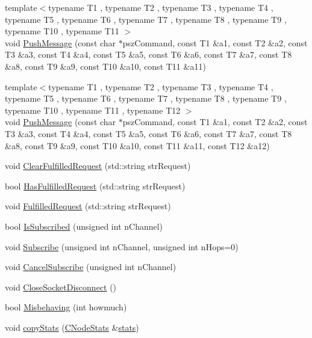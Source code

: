 \begin{DoxyCompactItemize}
\item 
{\footnotesize template$<$typename T1 , typename T2 , typename T3 , typename T4 , typename T5 , typename T6 , typename T7 , typename T8 , typename T9 , typename T10 , typename T11 $>$ }\\void \hyperlink{class_c_node_afeef78359562e34d7e62cbea4bc628fd}{Push\+Message} (const char $\ast$psz\+Command, const T1 \&a1, const T2 \&a2, const T3 \&a3, const T4 \&a4, const T5 \&a5, const T6 \&a6, const T7 \&a7, const T8 \&a8, const T9 \&a9, const T10 \&a10, const T11 \&a11)
\item 
{\footnotesize template$<$typename T1 , typename T2 , typename T3 , typename T4 , typename T5 , typename T6 , typename T7 , typename T8 , typename T9 , typename T10 , typename T11 , typename T12 $>$ }\\void \hyperlink{class_c_node_a9e9e15c8ba33b19041cbf2c2ffdbe9ab}{Push\+Message} (const char $\ast$psz\+Command, const T1 \&a1, const T2 \&a2, const T3 \&a3, const T4 \&a4, const T5 \&a5, const T6 \&a6, const T7 \&a7, const T8 \&a8, const T9 \&a9, const T10 \&a10, const T11 \&a11, const T12 \&a12)
\item 
void \hyperlink{class_c_node_aa57c7ad448501f5c8667d430b390b5ea}{Clear\+Fulfilled\+Request} (std\+::string str\+Request)
\item 
bool \hyperlink{class_c_node_ae94af0e82ca84242e420fc53debe6f25}{Has\+Fulfilled\+Request} (std\+::string str\+Request)
\item 
void \hyperlink{class_c_node_a5b378bdd447e2f1e63ced2ae5b36ed76}{Fulfilled\+Request} (std\+::string str\+Request)
\item 
bool \hyperlink{class_c_node_a2309cc5f763bce683337201ea5a640a2}{Is\+Subscribed} (unsigned int n\+Channel)
\item 
void \hyperlink{class_c_node_a47f2a21abf98bd2d2dba2894124d3114}{Subscribe} (unsigned int n\+Channel, unsigned int n\+Hops=0)
\item 
void \hyperlink{class_c_node_ac1be1dbc7917e7f5956dd063bd6f271d}{Cancel\+Subscribe} (unsigned int n\+Channel)
\item 
void \hyperlink{class_c_node_a63a6091a0b0fc0987d9436e1ec708423}{Close\+Socket\+Disconnect} ()
\item 
bool \hyperlink{class_c_node_a1923dffc7124eeedcc4bb58c2cd75754}{Misbehaving} (int howmuch)
\item 
void \hyperlink{class_c_node_aaa77188d9df85b80e3f8a30292acf6a9}{copy\+Stats} (\hyperlink{class_c_node_stats}{C\+Node\+Stats} \&\hyperlink{db__bench_8cc_a5925d216740c89f43482df806fd14e8c}{stats})
\end{DoxyCompactItemize}
